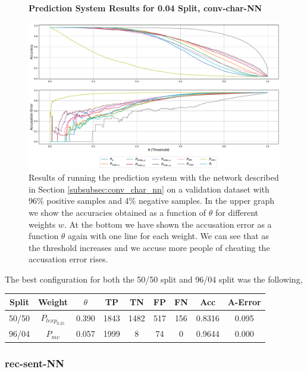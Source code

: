 \begin{figure}
    \centering
    \textbf{Prediction System Results for 0.04 Split, \glsdesc{conv-char-NN}}\par\medskip
    \includegraphics[scale=0.33]{./pictures/experiments/conv_char_nn/prediction_system_04}
    \caption{Results of running the prediction system with the network described
        in Section \ref{subsubsec:conv_char_nn} on a validation dataset with
        96\% positive samples and 4\% negative samples. In the upper graph we
        show the accuracies obtained as a function of $\theta$ for different
        weights $w$. At the bottom we have shown the accusation error as a
        function $\theta$ again with one line for each weight. We can see that
        as the threshold increases and we accuse more people of cheating the
        accusation error rises.}
    \label{fig:conv-char-NN-pred-4}
\end{figure}

The best configuration for both the 50/50 split and 96/04 split was the
following,
\begin{center}
\begin{tabular}{|c|c|c|c|c|c|c|c|c|}
\hline
Split & Weight            & $\theta$ & TP  & TN  & FP & FN & Acc    & A-Error \\ \hline
50/50 & $P_{lexp_{0.25}}$ & 0.390    & 1843 & 1482 & 517 & 156 & 0.8316 & 0.095   \\ \hline
96/04 & $P_{mv}$          & 0.057    & 1999 & 8    & 74  & 0   & 0.9644 & 0.000   \\ \hline
\end{tabular}
\end{center}

\subsubsection{\glsdesc{rec-sent-NN}}
\label{subsubsec:prediction_system_rec-sent-NN}

